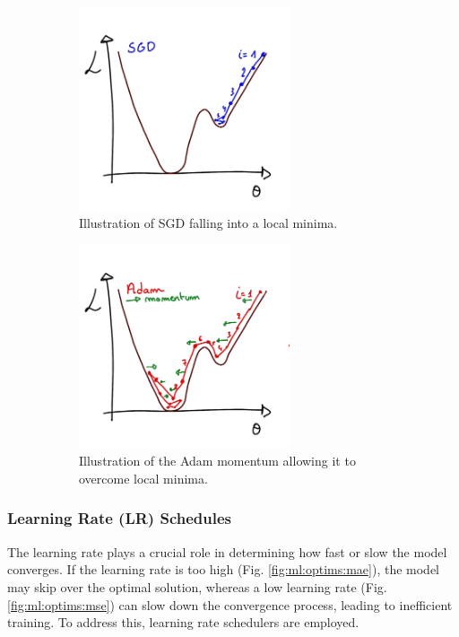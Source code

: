 \documentclass[../main.tex]{subfiles}
\begin{document}
\begin{figure}
  \centering
  \begin{subfigure}[t]{0.48\linewidth}
    \includegraphics[height=6cm]{images/ml/sgd.jpg}
    \caption{Illustration of SGD falling into a local minima.}
    \label{fig:ml:sgd}
  \end{subfigure}
  \hfill
  \begin{subfigure}[t]{0.48\linewidth}
    \includegraphics[height=6cm]{images/ml/Adam.jpg}
    \caption{Illustration of the Adam momentum allowing it to overcome local minima.}
    \label{fig:ml:adam}
  \end{subfigure}
  \caption{}
\end{figure}

\subsubsection{Learning Rate (LR) Schedules}

The learning rate plays a crucial role in determining how fast or slow the model converges. If the learning rate is too high (Fig. \ref{fig:ml:optims:mae}), the model may skip over the optimal solution, whereas a low learning rate (Fig. \ref{fig:ml:optims:mse}) can slow down the convergence process, leading to inefficient training. To address this, learning rate schedulers are employed.
\end{document}
